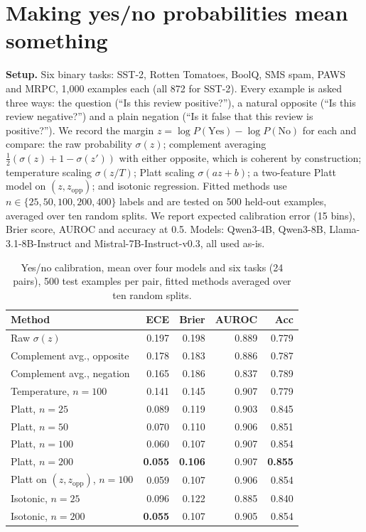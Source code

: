 \documentclass[10pt,twocolumn]{article}
\begin{document}
\section{Making yes/no probabilities mean something}

\textbf{Setup.} Six binary tasks: SST-2, Rotten Tomatoes, BoolQ, SMS spam, PAWS and MRPC, 1{,}000 examples each
(all 872 for SST-2). Every example is asked three ways: the question (``Is this review positive?''), a natural
opposite (``Is this review negative?'') and a plain negation (``Is it false that this review is positive?''). We record
the margin $z = \log P(\text{Yes}) - \log P(\text{No})$ for each and compare: the raw probability $\sigma(z)$;
complement averaging $\tfrac12(\sigma(z) + 1 - \sigma(z'))$ with either opposite, which is coherent by construction;
temperature scaling $\sigma(z/T)$; Platt scaling $\sigma(az+b)$; a two-feature Platt model on $(z, z_\text{opp})$; and
isotonic regression. Fitted methods use $n \in \{25, 50, 100, 200, 400\}$ labels and are tested on 500 held-out
examples, averaged over ten random splits. We report expected calibration error (15 bins), Brier score, AUROC and
accuracy at 0.5. Models: Qwen3-4B, Qwen3-8B, Llama-3.1-8B-Instruct and Mistral-7B-Instruct-v0.3, all used as-is.

\begin{table}[t]
\centering\small
\begin{tabular}{lrrrr}
\toprule
Method & ECE & Brier & AUROC & Acc \\
\midrule
Raw $\sigma(z)$ & 0.197 & 0.198 & 0.889 & 0.779 \\
Complement avg., opposite & 0.178 & 0.183 & 0.886 & 0.787 \\
Complement avg., negation & 0.165 & 0.186 & 0.837 & 0.789 \\
Temperature, $n{=}100$ & 0.141 & 0.145 & 0.907 & 0.779 \\
\midrule
Platt, $n{=}25$ & 0.089 & 0.119 & 0.903 & 0.845 \\
Platt, $n{=}50$ & 0.070 & 0.110 & 0.906 & 0.851 \\
Platt, $n{=}100$ & 0.060 & 0.107 & 0.907 & 0.854 \\
Platt, $n{=}200$ & \textbf{0.055} & \textbf{0.106} & 0.907 & \textbf{0.855} \\
Platt on $(z, z_\text{opp})$, $n{=}100$ & 0.059 & 0.107 & 0.906 & 0.854 \\
Isotonic, $n{=}25$ & 0.096 & 0.122 & 0.885 & 0.840 \\
Isotonic, $n{=}200$ & \textbf{0.055} & 0.107 & 0.905 & 0.854 \\
\bottomrule
\end{tabular}
\caption{Yes/no calibration, mean over four models and six tasks (24 pairs), 500 test examples per pair, fitted
methods averaged over ten random splits.}
\label{tab:noul}
\end{table}
\end{document}
